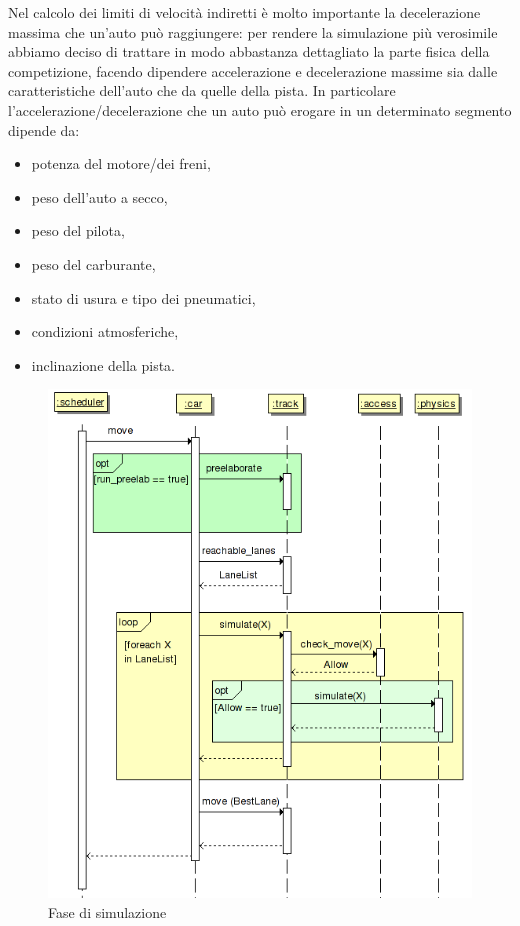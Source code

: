\documentclass[a4paper]{report}
\begin{document}
Nel calcolo dei limiti di velocità indiretti è molto importante la decelerazione massima che un'auto può raggiungere: per rendere la simulazione più verosimile abbiamo deciso di trattare in modo abbastanza dettagliato la parte fisica della competizione, facendo dipendere accelerazione e decelerazione massime sia dalle caratteristiche dell'auto che da quelle della pista.
In particolare l'accelerazione/decelerazione che un auto può erogare in un determinato segmento dipende da:
\begin{itemize}
\item potenza del motore/dei freni,
\item peso dell'auto a secco,
\item peso del pilota,
\item peso del carburante,
\item stato di usura e tipo dei pneumatici,
\item condizioni atmosferiche,
\item inclinazione della pista.
\end{itemize}

\begin{figure}
\includegraphics[width=\textwidth]{diagrammi/Simulation}
\caption{Fase di simulazione}
\label{fig:simulation}
\end{figure}
\end{document}
